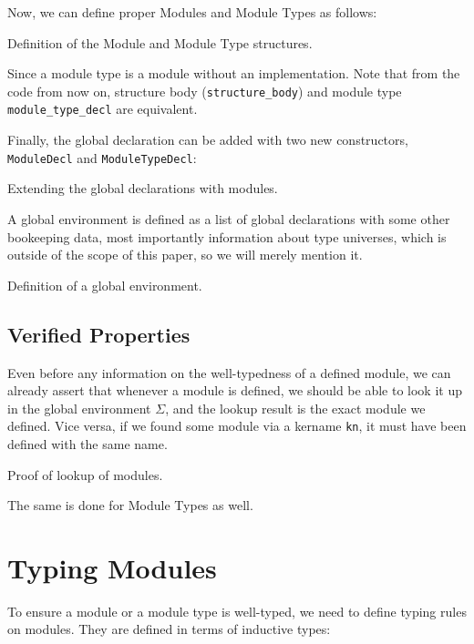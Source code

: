 Now, we can define proper Modules and Module Types as follows:
\begin{listing}[H]
  \caption{Definition of the Module and Module Type structures.}
  \label{lst:1-def-mt}
\end{listing}

Since a module type is a module without an implementation. Note that from the
code from now on, structure body (\verb|structure_body|) and module type
\verb|module_type_decl| are equivalent. 

Finally, the global declaration can be added with two new constructors,
\verb|ModuleDecl| and \verb|ModuleTypeDecl|:
\begin{listing}[H]
  \caption{Extending the global declarations with modules.}
  \label{lst:1-def-gd}
\end{listing}

A global environment is defined as a list of global declarations with some other
bookeeping data, most importantly information about type universes, which is
outside of the scope of this paper, so we will merely mention it.

\begin{listing}[H]
  \caption{Definition of a global environment.}
  \label{lst:1-def-env}
\end{listing}

\subsection*{Verified Properties}

Even before any information on the well-typedness of a defined module, we can
already assert that whenever a module is defined, we should be able to look it
up in the global environment $\Sigma$, and the lookup result is the exact module
we defined. Vice versa, if we found some module via a kername \verb|kn|, it must
have been defined with the same name.

\begin{listing}[H]
  \caption{Proof of lookup of modules.}
  \label{lst:1-mod-lookup}
\end{listing}

The same is done for Module Types as well.

\section{Typing Modules}
To ensure a module or a module type is well-typed, we need to define typing
rules on modules. They are defined in terms of inductive types:

